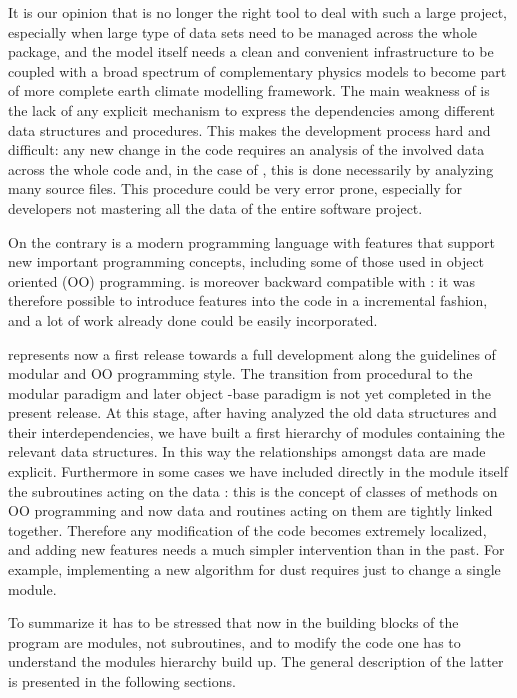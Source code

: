 It is our opinion that \oldfort is no longer the right tool to deal with
such a large project, especially when large type of data sets need to be
managed across the whole package, and the model itself needs a clean and
convenient infrastructure to be coupled with a broad spectrum of complementary
physics models to become part of more complete earth climate modelling
framework. The main weakness of \oldfort is the lack
of any explicit mechanism to express the dependencies among different data
structures and procedures. This makes the development process hard and
difficult: any new change in the code requires an analysis of the involved
data across the whole code and, in the case of \oldfort, this is done
necessarily by analyzing many source files.  This procedure could be very
error prone, especially for developers not mastering all the data of the
entire software project.  \par On the contrary \fort is a modern
programming language with features that support new important programming
concepts, including some of those used in object oriented (OO)
programming. \fort is moreover backward compatible with \oldfort: it was
therefore possible to introduce \fort features into the code in a
incremental fashion, and a lot of work already done could be easily
incorporated.\par
\PR represents now a first release towards a full development along the 
guidelines of modular and OO programming style.  The transition from
procedural to the modular paradigm and later object -base paradigm is not
yet completed in the present release.  At this stage, after having analyzed
the old data structures and their interdependencies, we have built a first
hierarchy of modules containing the relevant data structures. In this way
the relationships amongst data are made explicit. Furthermore in some
cases we have included directly in the module itself the subroutines acting
on the data : this is the concept of classes of methods on OO programming
and now data and routines acting on them are tightly linked
together. Therefore any modification of the code becomes extremely
localized, and adding new features needs a much simpler
intervention than in the past. For example, implementing a new algorithm
for dust requires just to change a single \fort module. \par
To summarize it has to be stressed that now in \fort the building blocks
of the program are modules, not subroutines, and to modify the code one has
to understand the modules hierarchy build up. The general description of
the latter is presented in the following sections.

